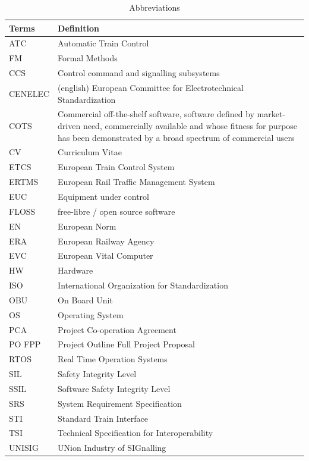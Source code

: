 \documentclass{template/openetcs_report}
\begin{document}
\begin{table} [h]
\begin{tabular}{|p{2cm}|p{12cm}|}
    \hline\hline
    \bfseries Terms & \bfseries Definition\\
    \hline\hline
    ATC & Automatic Train Control\\
    \hline
    FM & Formal Methods\\
    \hline
    CCS & Control command and signalling subsystems\\
    \hline
    CENELEC & (english) European Committee for Electrotechnical Standardization\\
    \hline
    COTS & Commercial off-the-shelf software, software defined by market-driven need, commercially available   and whose fitness for purpose has been demonstrated by a broad spectrum of commercial users\\
    \hline
    CV & Curriculum Vitae\\
    \hline
    ETCS & European Train Control System\\
    \hline
    ERTMS & European Rail Traffic Management System\\
    \hline
    EUC & Equipment under control\\
    \hline
    FLOSS & free-libre / open source software\\
    \hline
    EN & European Norm\\
    \hline
    ERA & European Railway Agency\\
    \hline
    EVC & European Vital Computer\\
    \hline
    HW & Hardware\\
    \hline
    ISO & International Organization for Standardization\\
    \hline
    OBU & On Board Unit\\
    \hline
    OS & Operating System\\
    \hline
    PCA & Project Co-operation Agreement\\
    \hline
    PO FPP & Project Outline Full Project Proposal\\
    \hline
    RTOS & Real Time Operation Systems\\
    \hline
    SIL & Safety Integrity Level\\
    \hline
    SSIL & Software Safety Integrity Level\\
    \hline
    SRS & System Requirement Specification \\
    \hline
    STI & Standard Train Interface \\
    \hline
    TSI & Technical Specification for Interoperability\\
    \hline
    UNISIG & UNion Industry of SIGnalling\\
\hline
\end{tabular}
\\
\caption{Abbreviations}
\end{table}
\end{document}
